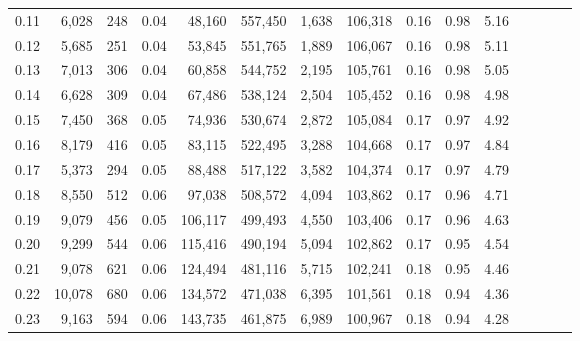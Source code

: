 \begin{tabular}{rrrcrrrrrrrrrrr}
0.11 &   6,028 &    248 &                                       0.04 &   48,160 &  557,450 &    1,638 &  106,318 &  0.16 &  0.98 &                         5.16 \\
0.12 &   5,685 &    251 &                                       0.04 &   53,845 &  551,765 &    1,889 &  106,067 &  0.16 &  0.98 &                         5.11 \\
0.13 &   7,013 &    306 &                                       0.04 &   60,858 &  544,752 &    2,195 &  105,761 &  0.16 &  0.98 &                         5.05 \\
0.14 &   6,628 &    309 &                                       0.04 &   67,486 &  538,124 &    2,504 &  105,452 &  0.16 &  0.98 &                         4.98 \\
0.15 &   7,450 &    368 &                                       0.05 &   74,936 &  530,674 &    2,872 &  105,084 &  0.17 &  0.97 &                         4.92 \\
0.16 &   8,179 &    416 &                                       0.05 &   83,115 &  522,495 &    3,288 &  104,668 &  0.17 &  0.97 &                         4.84 \\
0.17 &   5,373 &    294 &                                       0.05 &   88,488 &  517,122 &    3,582 &  104,374 &  0.17 &  0.97 &                         4.79 \\
0.18 &   8,550 &    512 &                                       0.06 &   97,038 &  508,572 &    4,094 &  103,862 &  0.17 &  0.96 &                         4.71 \\
0.19 &   9,079 &    456 &                                       0.05 &  106,117 &  499,493 &    4,550 &  103,406 &  0.17 &  0.96 &                         4.63 \\
0.20 &   9,299 &    544 &                                       0.06 &  115,416 &  490,194 &    5,094 &  102,862 &  0.17 &  0.95 &                         4.54 \\
0.21 &   9,078 &    621 &                                       0.06 &  124,494 &  481,116 &    5,715 &  102,241 &  0.18 &  0.95 &                         4.46 \\
0.22 &  10,078 &    680 &                                       0.06 &  134,572 &  471,038 &    6,395 &  101,561 &  0.18 &  0.94 &                         4.36 \\
0.23 &   9,163 &    594 &                                       0.06 &  143,735 &  461,875 &    6,989 &  100,967 &  0.18 &  0.94 &                         4.28 \\

\end{tabular}
